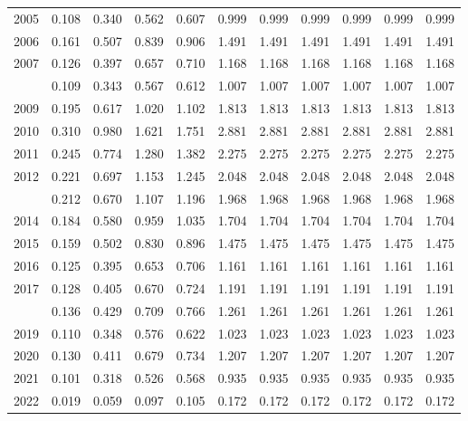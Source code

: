 \documentclass[
]{article}
\begin{document}
\begin{longtable}[t]{lrrrrrrrrrr}
2005 & 0.108 & 0.340 & 0.562 & 0.607 & 0.999 & 0.999 & 0.999 & 0.999 & 0.999 & 0.999\\
2006 & 0.161 & 0.507 & 0.839 & 0.906 & 1.491 & 1.491 & 1.491 & 1.491 & 1.491 & 1.491\\
2007 & 0.126 & 0.397 & 0.657 & 0.710 & 1.168 & 1.168 & 1.168 & 1.168 & 1.168 & 1.168\\
\addlinespace
2008 & 0.109 & 0.343 & 0.567 & 0.612 & 1.007 & 1.007 & 1.007 & 1.007 & 1.007 & 1.007\\
2009 & 0.195 & 0.617 & 1.020 & 1.102 & 1.813 & 1.813 & 1.813 & 1.813 & 1.813 & 1.813\\
2010 & 0.310 & 0.980 & 1.621 & 1.751 & 2.881 & 2.881 & 2.881 & 2.881 & 2.881 & 2.881\\
2011 & 0.245 & 0.774 & 1.280 & 1.382 & 2.275 & 2.275 & 2.275 & 2.275 & 2.275 & 2.275\\
2012 & 0.221 & 0.697 & 1.153 & 1.245 & 2.048 & 2.048 & 2.048 & 2.048 & 2.048 & 2.048\\
\addlinespace
2013 & 0.212 & 0.670 & 1.107 & 1.196 & 1.968 & 1.968 & 1.968 & 1.968 & 1.968 & 1.968\\
2014 & 0.184 & 0.580 & 0.959 & 1.035 & 1.704 & 1.704 & 1.704 & 1.704 & 1.704 & 1.704\\
2015 & 0.159 & 0.502 & 0.830 & 0.896 & 1.475 & 1.475 & 1.475 & 1.475 & 1.475 & 1.475\\
2016 & 0.125 & 0.395 & 0.653 & 0.706 & 1.161 & 1.161 & 1.161 & 1.161 & 1.161 & 1.161\\
2017 & 0.128 & 0.405 & 0.670 & 0.724 & 1.191 & 1.191 & 1.191 & 1.191 & 1.191 & 1.191\\
\addlinespace
2018 & 0.136 & 0.429 & 0.709 & 0.766 & 1.261 & 1.261 & 1.261 & 1.261 & 1.261 & 1.261\\
2019 & 0.110 & 0.348 & 0.576 & 0.622 & 1.023 & 1.023 & 1.023 & 1.023 & 1.023 & 1.023\\
2020 & 0.130 & 0.411 & 0.679 & 0.734 & 1.207 & 1.207 & 1.207 & 1.207 & 1.207 & 1.207\\
2021 & 0.101 & 0.318 & 0.526 & 0.568 & 0.935 & 0.935 & 0.935 & 0.935 & 0.935 & 0.935\\
2022 & 0.019 & 0.059 & 0.097 & 0.105 & 0.172 & 0.172 & 0.172 & 0.172 & 0.172 & 0.172\\*
\end{longtable}
\end{document}
